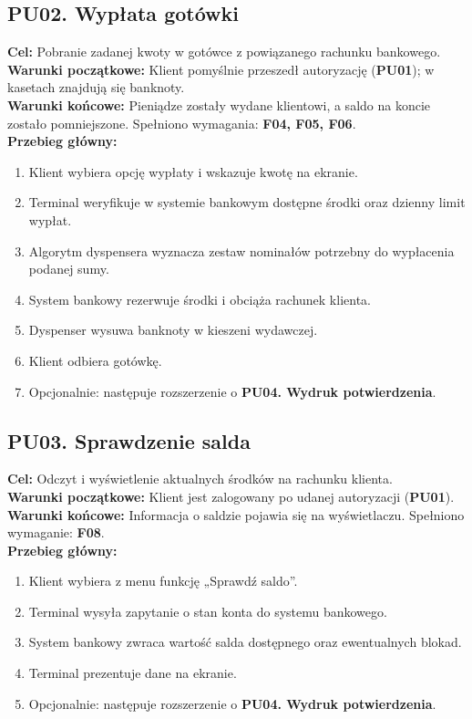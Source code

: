 \documentclass[12pt]{article}
\begin{document}
\subsection*{PU02. Wypłata gotówki}
\textbf{Cel:} Pobranie zadanej kwoty w gotówce z powiązanego rachunku bankowego.\\
\textbf{Warunki początkowe:} Klient pomyślnie przeszedł autoryzację (\textbf{PU01}); w kasetach znajdują się banknoty.\\
\textbf{Warunki końcowe:} Pieniądze zostały wydane klientowi, a saldo na koncie zostało pomniejszone. Spełniono wymagania: \textbf{F04, F05, F06}.\\
\textbf{Przebieg główny:}
\begin{enumerate}
    \item Klient wybiera opcję wypłaty i wskazuje kwotę na ekranie.
    \item Terminal weryfikuje w systemie bankowym dostępne środki oraz dzienny limit wypłat.
    \item Algorytm dyspensera wyznacza zestaw nominałów potrzebny do wypłacenia podanej sumy.
    \item System bankowy rezerwuje środki i obciąża rachunek klienta.
    \item Dyspenser wysuwa banknoty w kieszeni wydawczej.
    \item Klient odbiera gotówkę.
    \item Opcjonalnie: następuje rozszerzenie o \textbf{PU04. Wydruk potwierdzenia}.
\end{enumerate}

\subsection*{PU03. Sprawdzenie salda}
\textbf{Cel:} Odczyt i wyświetlenie aktualnych środków na rachunku klienta.\\
\textbf{Warunki początkowe:} Klient jest zalogowany po udanej autoryzacji (\textbf{PU01}).\\
\textbf{Warunki końcowe:} Informacja o saldzie pojawia się na wyświetlaczu. Spełniono wymaganie: \textbf{F08}.\\
\textbf{Przebieg główny:}
\begin{enumerate}
    \item Klient wybiera z menu funkcję „Sprawdź saldo”.
    \item Terminal wysyła zapytanie o stan konta do systemu bankowego.
    \item System bankowy zwraca wartość salda dostępnego oraz ewentualnych blokad.
    \item Terminal prezentuje dane na ekranie.
    \item Opcjonalnie: następuje rozszerzenie o \textbf{PU04. Wydruk potwierdzenia}.
\end{enumerate}
\end{document}
